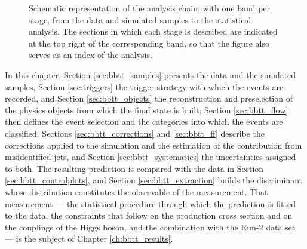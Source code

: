 \begin{figure}[tp]
\caption[Schematic of the $bb\tau\tau$ analysis chain]{Schematic representation of the analysis chain, with one band per stage, from the data and simulated samples to the statistical analysis. The sections in which each stage is described are indicated at the top right of the corresponding band, so that the figure also serves as an index of the analysis.}
\label{fig:bbtt_flow}
\end{figure}



In this chapter, Section \ref{sec:bbtt_samples} presents the data and the simulated samples, Section \ref{sec:triggers} the trigger strategy with which the events are recorded, and Section \ref{sec:bbtt_objects} the reconstruction and preselection of the physics objects from which the final state is built; Section \ref{sec:bbtt_flow} then defines the event selection and the categories into which the events are classified. Sections \ref{sec:bbtt_corrections} and \ref{sec:bbtt_ff} describe the corrections applied to the simulation and the estimation of the contribution from misidentified jets, and Section \ref{sec:bbtt_systematics} the uncertainties assigned to both. The resulting prediction is compared with the data in Section \ref{sec:bbtt_controlplots}, and Section \ref{sec:bbtt_extraction} builds the discriminant whose distribution constitutes the observable of the measurement. That measurement — the statistical procedure through which the prediction is fitted to the data, the constraints that follow on the production cross section and on the couplings of the Higgs boson, and the combination with the Run-2 data set — is the subject of Chapter \ref{ch:bbtt_results}.




